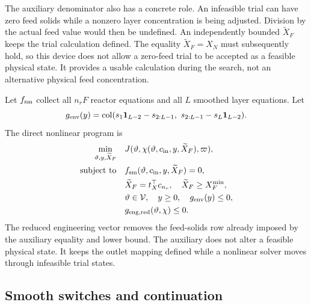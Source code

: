 The auxiliary denominator also has a concrete role. An infeasible trial can have zero feed solids while a nonzero layer concentration is being adjusted. Division by the actual feed value would then be undefined. An independently bounded $\widetilde X_F$ keeps the trial calculation defined. The equality $\widetilde X_F=X_N$ must subsequently hold, so this device does not allow a zero-feed trial to be accepted as a feasible physical state. It provides a usable calculation during the search, not an alternative physical feed concentration.

Let $f_{\rm sm}$ collect all $n_rF$ reactor equations and all $L$ smoothed layer equations. Let
\begin{equation}
g_{\rm env}(y)=\operatorname{col}
(s_1\mathbf1_{L-2}-s_{2:L-1},\ s_{2:L-1}-s_L\mathbf1_{L-2}).
\end{equation}
The direct nonlinear program is
\begin{equation}
\begin{aligned}
\min_{\vartheta,y,\widetilde X_F}\quad&J(\vartheta,\chi(\vartheta,c_{\rm in},y,\widetilde X_F),\varpi),\\
\text{subject to}\quad&f_{\rm sm}(\vartheta,c_{\rm in},y,\widetilde X_F)=0,\\
&\widetilde X_F=t_X^\top c_{n_r},\quad\widetilde X_F\ge X_F^{\min},\\
&\vartheta\in\mathcal V,\quad y\ge0,\quad g_{\rm env}(y)\le0,\\
&g_{{\rm eng},\rm red}(\vartheta,\chi)\le0.
\end{aligned}
\label{eq:plant_direct_optimization}
\end{equation}
The reduced engineering vector removes the feed-solids row already imposed by the auxiliary equality and lower bound. The auxiliary does not alter a feasible physical state. It keeps the outlet mapping defined while a nonlinear solver moves through infeasible trial states.

\subsection{Smooth switches and continuation}

